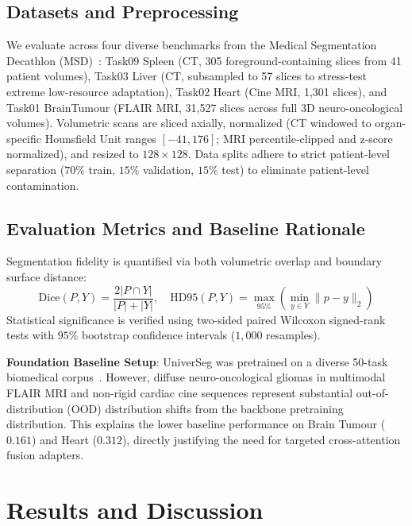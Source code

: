 \documentclass[runningheads]{llncs}
\begin{document}
\subsection{Datasets and Preprocessing}
We evaluate across four diverse benchmarks from the Medical Segmentation Decathlon (MSD)~\cite{simpson2019large}: Task09 Spleen (CT, 305 foreground-containing slices from 41 patient volumes), Task03 Liver (CT, subsampled to 57 slices to stress-test extreme low-resource adaptation), Task02 Heart (Cine MRI, 1,301 slices), and Task01 BrainTumour (FLAIR MRI, 31,527 slices across full 3D neuro-oncological volumes). Volumetric scans are sliced axially, normalized (CT windowed to organ-specific Hounsfield Unit ranges $[-41, 176]$; MRI percentile-clipped and z-score normalized), and resized to $128 \times 128$. Data splits adhere to strict patient-level separation ($70\%$ train, $15\%$ validation, $15\%$ test) to eliminate patient-level contamination.

\subsection{Evaluation Metrics and Baseline Rationale}
Segmentation fidelity is quantified via both volumetric overlap and boundary surface distance:
\begin{equation}
    \text{Dice}(P, Y) = \frac{2 |P \cap Y|}{|P| + |Y|}, \quad \text{HD95}(P, Y) = \max_{95\%} \left( \min_{y \in Y} \|p - y\|_2 \right)
\end{equation}
Statistical significance is verified using two-sided paired Wilcoxon signed-rank tests with $95\%$ bootstrap confidence intervals ($1,000$ resamples). 

\textbf{Foundation Baseline Setup}: UniverSeg was pretrained on a diverse 50-task biomedical corpus~\cite{butoi2023universeg}. However, diffuse neuro-oncological gliomas in multimodal FLAIR MRI and non-rigid cardiac cine sequences represent substantial out-of-distribution (OOD) distribution shifts from the backbone pretraining distribution. This explains the lower baseline performance on Brain Tumour ($0.161$) and Heart ($0.312$), directly justifying the need for targeted cross-attention fusion adapters.

\section{Results and Discussion}
\label{sec:results}
\end{document}
